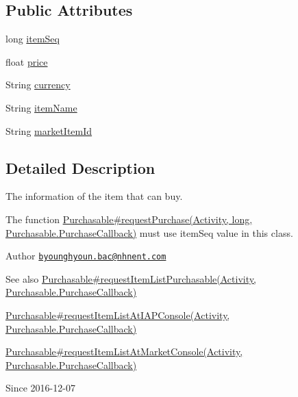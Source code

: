 \subsection*{Public Attributes}
\begin{DoxyCompactItemize}
\item 
long \hyperlink{classcom_1_1toast_1_1android_1_1gamebase_1_1base_1_1purchase_1_1_purchasable_item_ae238e7a4dbb904519cb83075b2ac046f}{item\+Seq}
\item 
float \hyperlink{classcom_1_1toast_1_1android_1_1gamebase_1_1base_1_1purchase_1_1_purchasable_item_a500426aec97889b7572f25ae45c06a8d}{price}
\item 
String \hyperlink{classcom_1_1toast_1_1android_1_1gamebase_1_1base_1_1purchase_1_1_purchasable_item_a21ef1fb8b40391856719451100a37a00}{currency}
\item 
String \hyperlink{classcom_1_1toast_1_1android_1_1gamebase_1_1base_1_1purchase_1_1_purchasable_item_aee3a122fff06051fbf74cc9051fb90c4}{item\+Name}
\item 
String \hyperlink{classcom_1_1toast_1_1android_1_1gamebase_1_1base_1_1purchase_1_1_purchasable_item_a5d29b8e8b35b651ac8ec048046b800c3}{market\+Item\+Id}
\end{DoxyCompactItemize}


\subsection{Detailed Description}
The information of the item that can buy. 

The function \hyperlink{}{Purchasable\#request\+Purchase(\+Activity, long, Purchasable.\+Purchase\+Callback)} must use \textquotesingle{}item\+Seq\textquotesingle{} value in this class.

\begin{DoxyAuthor}{Author}
\href{mailto:byounghyoun.bac@nhnent.com}{\tt byounghyoun.\+bac@nhnent.\+com} 
\end{DoxyAuthor}
\begin{DoxySeeAlso}{See also}
\hyperlink{}{Purchasable\#request\+Item\+List\+Purchasable(\+Activity, Purchasable.\+Purchase\+Callback)} 

\hyperlink{}{Purchasable\#request\+Item\+List\+At\+I\+A\+P\+Console(\+Activity, Purchasable.\+Purchase\+Callback)} 

\hyperlink{}{Purchasable\#request\+Item\+List\+At\+Market\+Console(\+Activity, Purchasable.\+Purchase\+Callback)} 
\end{DoxySeeAlso}
\begin{DoxySince}{Since}
2016-\/12-\/07 
\end{DoxySince}


